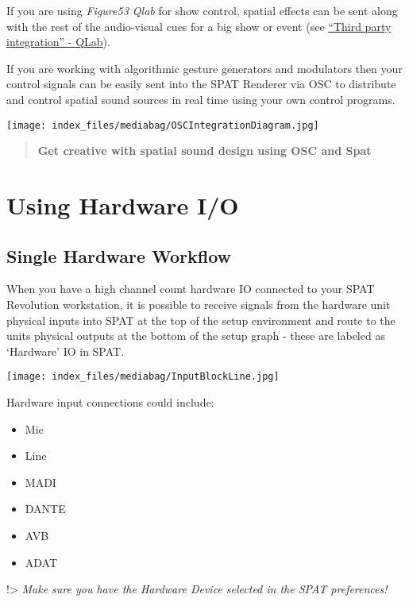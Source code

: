 \documentclass[
  letterpaper,
  DIV=11,
  numbers=noendperiod]{scrreport}
\providecommand{\tightlist}{%
  \setlength{\itemsep}{0pt}\setlength{\parskip}{0pt}}\usepackage{longtable,booktabs,array}
\begin{document}
If you are using \emph{Figure53 Qlab} for show control, spatial effects
can be sent along with the rest of the audio-visual cues for a big show
or event (see \href{Third_Party_Figure53_QLab.md}{``Third party
integration'' - QLab}).

If you are working with algorithmic gesture generators and modulators
then your control signals can be easily sent into the SPAT Renderer via
OSC to distribute and control spatial sound sources in real time using
your own control programs.

\texttt{[image: index\_files/mediabag/OSCIntegrationDiagram.jpg]}

\begin{quote}
\textbf{Get creative with spatial sound design using OSC and Spat}
\end{quote}

\hypertarget{using-hardware-io}{%
\chapter{Using Hardware I/O}\label{using-hardware-io}}

\hypertarget{single-hardware-workflow}{%
\section{Single Hardware Workflow}\label{single-hardware-workflow}}

When you have a high channel count hardware IO connected to your SPAT
Revolution workstation, it is possible to receive signals from the
hardware unit physical inputs into SPAT at the top of the setup
environment and route to the units physical outputs at the bottom of the
setup graph - these are labeled as `Hardware' IO in SPAT.

\texttt{[image: index\_files/mediabag/InputBlockLine.jpg]}

Hardware input connections could include:

\begin{itemize}
\tightlist
\item
  Mic
\item
  Line
\item
  MADI
\item
  DANTE
\item
  AVB
\item
  ADAT
\end{itemize}

!\textgreater{} \emph{Make sure you have the Hardware Device selected in
the SPAT preferences!}
\end{document}

